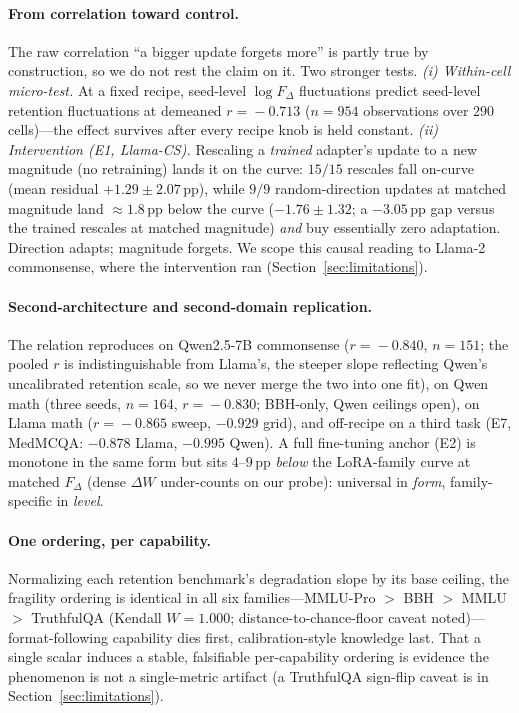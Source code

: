 \documentclass[11pt]{article}
\newcommand{\dw}{F_{\Delta}}
\begin{document}
\paragraph{From correlation toward control.} The raw correlation ``a bigger
update forgets more'' is partly true by construction, so we do not rest the claim
on it. Two stronger tests. \emph{(i) Within-cell micro-test.} At a fixed recipe,
seed-level $\log\dw$ fluctuations predict seed-level retention fluctuations at
demeaned $r\!=\!-0.713$ ($n\!=\!954$ observations over $290$ cells)---the effect
survives after every recipe knob is held constant. \emph{(ii) Intervention
(E1, Llama-CS).} Rescaling a \emph{trained} adapter's update to a new magnitude
(no retraining) lands it on the curve: $15/15$ rescales fall on-curve
(mean residual $+1.29\!\pm\!2.07$\,pp), while $9/9$ random-direction updates at
matched magnitude land $\approx\!1.8$\,pp below the curve
($-1.76\!\pm\!1.32$; a $-3.05$\,pp gap versus the trained rescales at matched
magnitude) \emph{and} buy essentially zero adaptation. Direction adapts; magnitude
forgets. We scope this causal reading to Llama-2 commonsense, where the
intervention ran (Section~\ref{sec:limitations}).

\paragraph{Second-architecture and second-domain replication.} The relation
reproduces on Qwen2.5-7B commonsense ($r\!=\!-0.840$, $n\!=\!151$; the pooled $r$
is indistinguishable from Llama's, the steeper slope reflecting Qwen's uncalibrated
retention scale, so we never merge the two into one fit), on Qwen math (three
seeds, $n\!=\!164$, $r\!=\!-0.830$; BBH-only, Qwen ceilings open), on Llama math
($r\!=\!-0.865$ sweep, $-0.929$ grid), and off-recipe on a third task (E7, MedMCQA:
$-0.878$ Llama, $-0.995$ Qwen). A full fine-tuning anchor (E2) is monotone in the
same form but sits $4$--$9$\,pp \emph{below} the LoRA-family curve at matched $\dw$
(dense $\Delta W$ under-counts on our probe): universal in \emph{form},
family-specific in \emph{level}.

\paragraph{One ordering, per capability.} Normalizing each retention benchmark's
degradation slope by its base ceiling, the fragility ordering is identical in all
six families---MMLU-Pro ${>}$ BBH ${>}$ MMLU ${>}$ TruthfulQA (Kendall
$W\!=\!1.000$; distance-to-chance-floor caveat noted)---%
format-following capability dies first, calibration-style knowledge last. That a
single scalar induces a stable, falsifiable per-capability ordering is evidence
the phenomenon is not a single-metric artifact (a TruthfulQA sign-flip caveat is
in Section~\ref{sec:limitations}).
\end{document}

